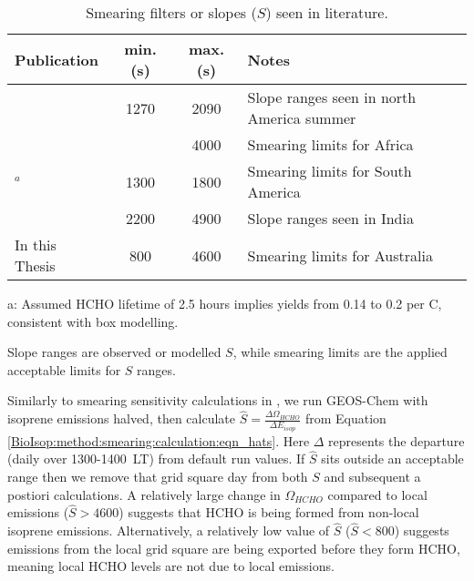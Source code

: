      \begin{table}\begin{threeparttable}
          \caption{Smearing filters or slopes ($S$) seen in literature.}
          \begin{tabular}{ l | c  c  >{\centering\arraybackslash}p{5cm} } 
            \toprule
            Publication & min. (s) & max. (s) & Notes \\
            \midrule
            \textcite{Palmer2003}      & 1270 & 2090 & Slope ranges seen in north America summer \\
            \textcite{Marais2012}      &      & 4000 & Smearing limits for Africa \\
            \textcite{Barkley2013}$^a$ & 1300 & 1800 & Smearing limits for South America \\
            \textcite{Surl2018}        & 2200 & 4900 & Slope ranges seen in India \\
            In this Thesis             & 800  & 4600 & Smearing limits for Australia \\
            
            \bottomrule
          \end{tabular}
          \begin{tablenotes} 
            \item a: Assumed HCHO lifetime of 2.5 hours implies yields from 0.14 to 0.2 per C, consistent with box modelling.
            \item Slope ranges are observed or modelled $S$, while smearing limits are the applied acceptable limits for $S$ ranges. 
          \end{tablenotes}
          \label{BioIsop:method:smearing:tab_smearing_ranges}
        \end{threeparttable}\end{table}
      
      
      Similarly to smearing sensitivity calculations in \textcite{Marais2012}, we run GEOS-Chem with isoprene emissions halved, then calculate $\hat{S} = \frac{\Delta \Omega_{HCHO}}{\Delta E_{isop}} $ from Equation \ref{BioIsop:method:smearing:calculation:eqn_hats}.
      Here $\Delta$ represents the departure (daily over 1300-1400~LT) from default run values.
      If $\hat{S}$ sits outside an acceptable range then we remove that grid square day from both $S$ and subsequent a postiori calculations.
      A relatively large change in $\Omega_{HCHO}$ compared to local emissions ($\hat{S}>4600$) suggests that HCHO is being formed from non-local isoprene emissions.
      Alternatively, a relatively low value of $\hat{S}$ ($\hat{S}<800$) suggests emissions from the local grid square are being exported before they form HCHO, meaning local HCHO levels are not due to local emissions.
      
